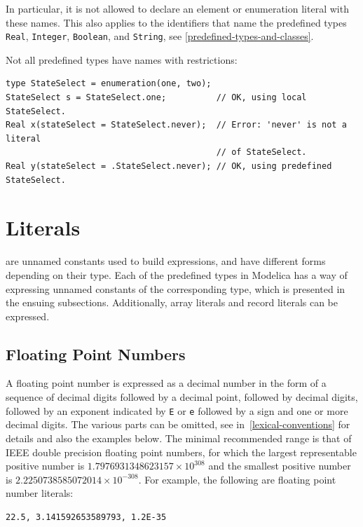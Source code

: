In particular, it is not allowed to declare an element or enumeration literal with these names.
This also applies to the identifiers that name the predefined types \lstinline!Real!, \lstinline!Integer!, \lstinline!Boolean!, and \lstinline!String!, see \cref{predefined-types-and-classes}.

\begin{example}
Not all predefined types have names with restrictions:
\begin{lstlisting}[language=modelica]
type StateSelect = enumeration(one, two);
StateSelect s = StateSelect.one;          // OK, using local StateSelect.
Real x(stateSelect = StateSelect.never);  // Error: 'never' is not a literal
                                          // of StateSelect.
Real y(stateSelect = .StateSelect.never); // OK, using predefined StateSelect.
\end{lstlisting}
\end{example}


\section{Literals}\label{literals}

 are unnamed constants used to build expressions, and have different forms depending on their type.
Each of the predefined types in Modelica has a way of expressing unnamed constants of the corresponding type, which is presented in the ensuing subsections.
Additionally, array literals and record literals can be expressed.


\subsection{Floating Point Numbers}\label{floating-point-numbers}

A floating point number is expressed as a decimal number in the form of a sequence of decimal digits followed by a decimal point, followed by decimal digits, followed by an exponent indicated by \lstinline!E! or \lstinline!e! followed by a sign and one or more decimal digits.
The various parts can be omitted, see  in~\cref{lexical-conventions} for details and also the examples below.
The minimal recommended range is that of IEEE double precision floating point numbers, for which the largest representable positive number is $1.7976931348623157\times10^{308}$ and the smallest positive number is $2.2250738585072014\times 10^{-308}$.
For example, the following are floating point number literals:
\begin{lstlisting}[language=modelica]
22.5, 3.141592653589793, 1.2E-35
\end{lstlisting}

